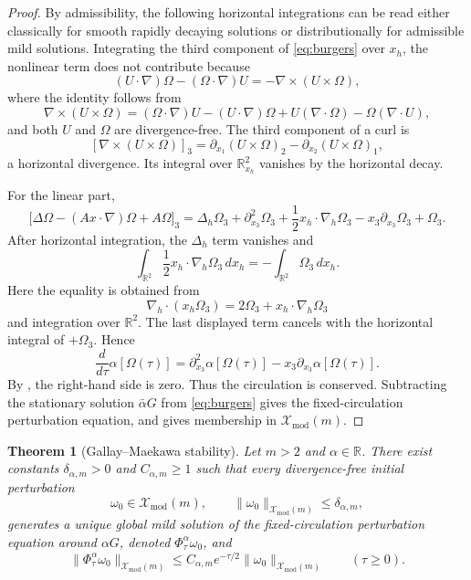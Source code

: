 \documentclass[11pt]{amsart}
\theoremstyle{plain}
\newtheorem{theorem}{Theorem}[section]
\theoremstyle{definition}
\theoremstyle{remark}
\numberwithin{equation}{section}
\begin{document}
\begin{proof}
By admissibility, the following horizontal integrations can be read either
classically for smooth rapidly decaying solutions or distributionally for
admissible mild solutions.  Integrating the third component of
\eqref{eq:burgers} over \(x_h\), the nonlinear term does not contribute because
\[
   (U\cdot\nabla)\Omega-(\Omega\cdot\nabla)U
   =
   -\nabla\times(U\times\Omega),
\]
where the identity follows from
\[
   \nabla\times(U\times\Omega)
   =
   (\Omega\cdot\nabla)U-(U\cdot\nabla)\Omega
   +U(\nabla\cdot\Omega)-\Omega(\nabla\cdot U),
\]
and both \(U\) and \(\Omega\) are divergence-free.  The third component of a
curl is
\[
   [\nabla\times(U\times\Omega)]_3
   =
   \partial_{x_1}(U\times\Omega)_2
   -
   \partial_{x_2}(U\times\Omega)_1,
\]
a horizontal divergence.  Its integral over \(\mathbb R^2_{x_h}\) vanishes by
the horizontal decay.

For the linear part,
\[
   \bigl[\Delta\Omega-(Ax\cdot\nabla)\Omega+A\Omega\bigr]_3
   =
   \Delta_h\Omega_3+\partial_{x_3}^2\Omega_3
   +\frac12 x_h\cdot\nabla_h\Omega_3
   -x_3\partial_{x_3}\Omega_3+\Omega_3 .
\]
After horizontal integration, the \(\Delta_h\) term vanishes and
\[
   \int_{\mathbb R^2}\frac12 x_h\cdot\nabla_h\Omega_3\,dx_h
   =
   -\int_{\mathbb R^2}\Omega_3\,dx_h .
\]
Here the equality is obtained from
\[
   \nabla_h\cdot(x_h\Omega_3)
   =
   2\Omega_3+x_h\cdot\nabla_h\Omega_3
\]
and integration over \(\mathbb R^2\).  The last displayed term cancels with
the horizontal integral of \(+\Omega_3\).  Hence
\[
   \frac{d}{d\tau}\alpha[\Omega(\tau)]
   =
   \partial_{x_3}^2\alpha[\Omega(\tau)]
   -x_3\partial_{x_3}\alpha[\Omega(\tau)] .
\]
By , the right-hand side is zero.  Thus the circulation
is conserved.  Subtracting the stationary solution \(\bar\alpha G\) from
\eqref{eq:burgers} gives the fixed-circulation perturbation equation, and
 gives membership in \(\mathcal X_{\mathrm{mod}}(m)\).
\end{proof}

\begin{theorem}[Gallay--Maekawa stability]\label{thm:gm}
Let \(m>2\) and \(\alpha\in\mathbb R\).  There exist constants
\(\delta_{\alpha,m}>0\) and \(C_{\alpha,m}\ge1\) such that every
divergence-free initial perturbation
\[
   \omega_0\in\mathcal X_{\mathrm{mod}}(m),
   \qquad
   \|\omega_0\|_{\mathcal X_{\mathrm{mod}}(m)}
   \le\delta_{\alpha,m},
\]
generates a unique global mild solution of the fixed-circulation perturbation
equation around \(\alpha G\), denoted
\(\Phi_\tau^\alpha\omega_0\), and
\[
   \|\Phi_\tau^\alpha\omega_0\|_{\mathcal X_{\mathrm{mod}}(m)}
   \le
   C_{\alpha,m}e^{-\tau/2}
   \|\omega_0\|_{\mathcal X_{\mathrm{mod}}(m)}
   \qquad(\tau\ge0).
\]
\end{theorem}
\end{document}
